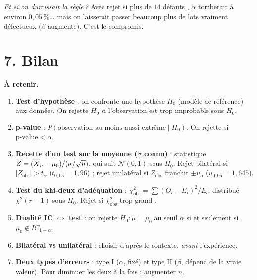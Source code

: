 \medskip

\textit{Et si on durcissait la règle\,?} Avec \og rejet si plus de $14$ défauts \fg{}, $\alpha$ tomberait à environ $0{,}05\,\%$... mais on laisserait passer beaucoup plus de lots vraiment défectueux ($\beta$ augmente). C'est le compromis.

\section*{7. Bilan}

\nopagebreak
\begin{mdframed}[backgroundcolor=ThemeLight, linecolor=Theme,
  linewidth=1.5pt, innertopmargin=10pt, innerbottommargin=10pt, nobreak=true]
\textbf{À retenir.}
\begin{enumerate}
  \item \textbf{Test d'hypothèse} : on confronte une hypothèse $H_0$ (modèle de référence) aux données. On rejette $H_0$ si l'observation est \og trop improbable \fg{} sous $H_0$.

  \item \textbf{p-value} : $P(\text{observation au moins aussi extrême} \mid H_0)$. On rejette si $\text{p-value} < \alpha$.

  \item \textbf{Recette d'un test sur la moyenne ($\sigma$ connu)} : statistique $Z = (\overline{X}_n - \mu_0)/(\sigma/\sqrt{n})$, qui suit $\mathcal{N}(0,1)$ sous $H_0$. Rejet bilatéral si $|Z_{\text{obs}}| > t_\alpha$ ($t_{0{,}05}=1{,}96$) ; rejet unilatéral si $Z_{\text{obs}}$ franchit $\pm u_\alpha$ ($u_{0{,}05}=1{,}645$).

  \item \textbf{Test du khi-deux d'adéquation} : $\chi^2_{\text{obs}} = \sum (O_i - E_i)^2/E_i$, distribué $\chi^2(r-1)$ sous $H_0$. Rejet si $\chi^2_{\text{obs}}$ \og trop grand \fg.

  \item \textbf{Dualité IC $\Leftrightarrow$ test} : on rejette $H_0 : \mu = \mu_0$ au seuil $\alpha$ si et seulement si $\mu_0 \notin IC_{1-\alpha}$.

  \item \textbf{Bilatéral vs unilatéral} : choisir d'après le contexte, \emph{avant} l'expérience.

  \item \textbf{Deux types d'erreurs} : type I ($\alpha$, fixé) et type II ($\beta$, dépend de la vraie valeur). Pour diminuer les deux à la fois : augmenter $n$.
\end{enumerate}
\end{mdframed}


